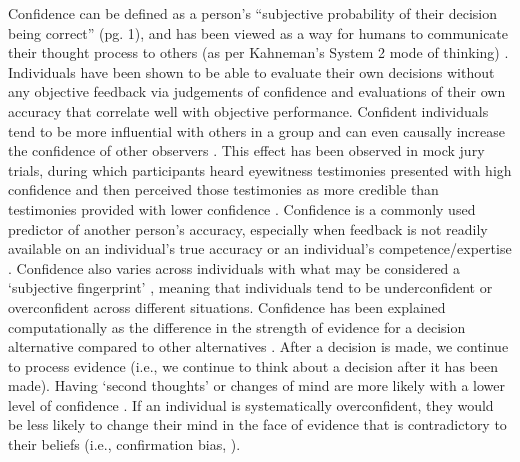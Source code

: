\documentclass[a4paper, nobind]{templates/ociamthesis}
\begin{document}
Confidence can be defined as a person's ``subjective probability of their decision being correct'' \autocite{fleming_self-evaluation_2017} (pg. 1), and has been viewed as a way for humans to communicate their thought process to others (as per Kahneman's System 2 mode of thinking) \autocite{shea_supra-personal_2014}. Individuals have been shown to be able to evaluate their own decisions without any objective feedback via judgements of confidence \autocite{henmon_relation_1911} and evaluations of their own accuracy \autocite{rabbitt_three_1968} that correlate well with objective performance. Confident individuals tend to be more influential with others in a group \autocite{zarnoth_social_1997} and can even causally increase the confidence of other observers \autocite{cheng_social_2021}. This effect has been observed in mock jury trials, during which participants heard eyewitness testimonies presented with high confidence and then perceived those testimonies as more credible than testimonies provided with lower confidence \autocite{cutler_eyewitness_1989,roediger_iii_curious_2012}. Confidence is a commonly used predictor of another person's accuracy, especially when feedback is not readily available on an individual's true accuracy or an individual's competence/expertise \autocite{price_intuitive_2004,pulford2018}. Confidence also varies across individuals with what may be considered a `subjective fingerprint' \autocite{ais_individual_2016}, meaning that individuals tend to be underconfident or overconfident across different situations. Confidence has been explained computationally as the difference in the strength of evidence for a decision alternative compared to other alternatives \autocite{vickers_effects_1982}. After a decision is made, we continue to process evidence (i.e., we continue to think about a decision after it has been made). Having `second thoughts' or changes of mind are more likely with a lower level of confidence \autocite{charles_dynamic_2019}. If an individual is systematically overconfident, they would be less likely to change their mind in the face of evidence that is contradictory to their beliefs (i.e., confirmation bias, \textcite{nickerson_confirmation_1998}).
\end{document}

